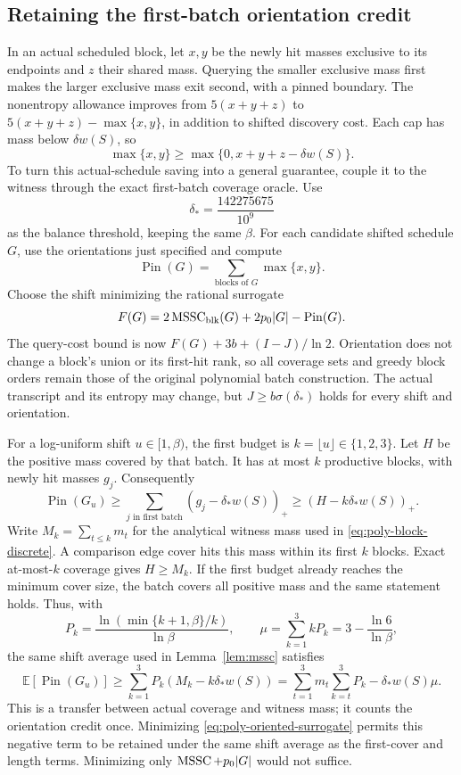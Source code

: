 \subsection{Retaining the first-batch orientation credit}

In an actual scheduled block, let $x,y$ be the newly hit masses
exclusive to its endpoints and $z$ their shared mass. Querying the
smaller exclusive mass first makes the larger exclusive mass exit
second, with a pinned boundary. The nonentropy allowance improves
from $5(x+y+z)$ to $5(x+y+z)-\max\{x,y\}$, in addition to shifted
discovery cost. Each cap has mass below $\delta w(S)$, so
\[
 \max\{x,y\}\ge\max\{0,x+y+z-\delta w(S)\}.
\]
To turn this actual-schedule saving into a general guarantee, couple it
to the witness through the exact first-batch coverage oracle. Use
\[
 \delta_* =\frac{142275675}{10^9}
\]
as the balance threshold, keeping the same $\beta$. For each candidate
shifted schedule $G$, use the orientations just specified and compute
\[
 \operatorname{Pin}(G)=\sum_{\text{blocks of }G}\max\{x,y\}.
\]
Choose the shift minimizing the rational surrogate
\begin{equation}\label{eq:poly-oriented-surrogate}
 F(G)=2\operatorname{MSSC}_{\mathrm{blk}}(G)+2p_0|G|-\operatorname{Pin}(G).
\end{equation}
The query-cost bound is now $F(G)+3b+(I-J)/\ln2$.
Orientation does not change a block's union or its first-hit rank, so
all coverage sets and greedy block orders remain those of the original
polynomial batch construction. The actual transcript and its entropy
may change, but $J\ge b\sigma(\delta_*)$ holds for every shift and
orientation.

For a log-uniform shift $u\in[1,\beta)$, the first budget is
$k=\lfloor u\rfloor\in\{1,2,3\}$. Let $H$ be the positive mass covered
by that batch. It has at most $k$ productive blocks, with newly hit
masses $g_j$. Consequently
\[
 \operatorname{Pin}(G_u)\ge
 \sum_{j\text{ in first batch}}(g_j-\delta_* w(S))_+
 \ge (H-k\delta_*w(S))_+.
\]
Write $M_k=\sum_{t\le k}m_t$ for the analytical witness mass used
in \eqref{eq:poly-block-discrete}. A comparison edge cover hits this
mass within its first $k$ blocks. Exact at-most-$k$ coverage gives
$H\ge M_k$. If the first budget already reaches the minimum cover size,
the batch covers all positive mass and the same statement holds.
Thus, with
\[
 P_k=\frac{\ln(\min\{k+1,\beta\}/k)}{\ln\beta},\qquad
 \mu=\sum_{k=1}^{3}kP_k=3-\frac{\ln6}{\ln\beta},
\]
the same shift average used in Lemma~\ref{lem:mssc} satisfies
\begin{equation}\label{eq:poly-oriented-transfer}
 \mathbb E[\operatorname{Pin}(G_u)]
 \ge\sum_{k=1}^{3}P_k(M_k-k\delta_*w(S))
 =\sum_{t=1}^{3}m_t\sum_{k=t}^{3}P_k-\delta_*w(S)\mu.
\end{equation}
This is a transfer between actual coverage and witness mass; it counts
the orientation credit once. Minimizing
\eqref{eq:poly-oriented-surrogate} permits this negative term to be
retained under the same shift average as the first-cover and length
terms. Minimizing only $\operatorname{MSSC}+p_0|G|$ would not suffice.

